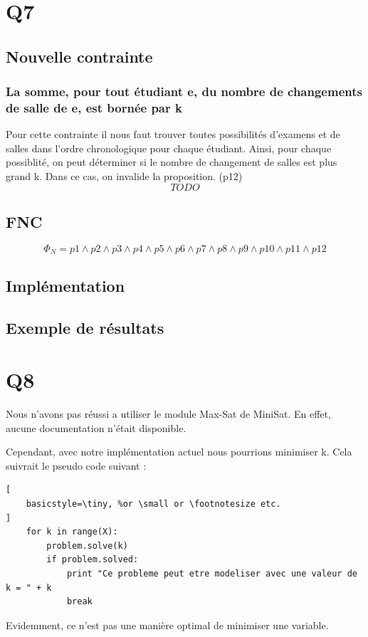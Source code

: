 \documentclass[a4paper,11pt]{article}
\begin{document}
\section{Q7}
\subsection{Nouvelle contrainte}
\subsubsection{La somme, pour tout étudiant e, du nombre de changements de salle de e, est bornée par k}
Pour cette contrainte il nous faut trouver toutes possibilités d'examens et de salles dans l'ordre chronologique pour chaque étudiant. Ainsi, pour chaque possiblité, on peut déterminer si le nombre de changement de salles est plus grand k. Dans ce cas, on invalide la proposition.
(p12)
\begin{displaymath}
	TODO	
\end{displaymath}

\subsection{FNC}
\begin{displaymath}
	\Phi_{N} = p1 \wedge p2 \wedge p3 \wedge p4 \wedge p5 \wedge p6 \wedge p7 \wedge p8 \wedge p9 \wedge p10 \wedge p11 \wedge p12
\end{displaymath}
	
\subsection{Implémentation}
\subsection{Exemple de résultats}

\section{Q8}

Nous n'avons pas réussi a utiliser le module Max-Sat de MiniSat.
En effet, aucune documentation n'était disponible.

Cependant, avec notre implémentation actuel nous pourrions minimiser k. Cela suivrait le pseudo code suivant :

\begin{lstlisting}[
    basicstyle=\tiny, %or \small or \footnotesize etc.
]
	for k in range(X):
		problem.solve(k)
		if problem.solved:
			print "Ce probleme peut etre modeliser avec une valeur de k = " + k
			break
\end{lstlisting}
Evidemment, ce n'est pas une manière optimal de minimiser une variable.
\end{document}
